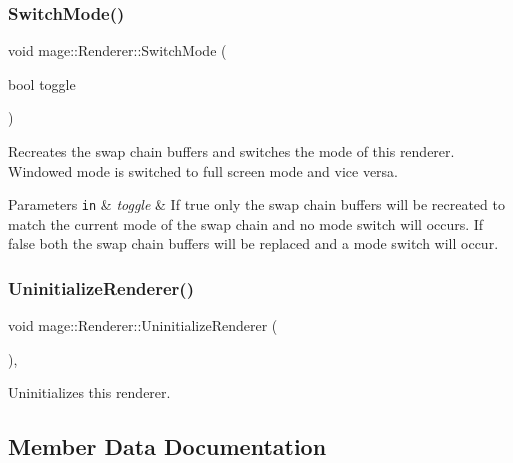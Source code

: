 \subsubsection{\texorpdfstring{Switch\+Mode()}{SwitchMode()}}
{\footnotesize\ttfamily void mage\+::\+Renderer\+::\+Switch\+Mode (\begin{DoxyParamCaption}\item[{bool}]{toggle }\end{DoxyParamCaption})}

Recreates the swap chain buffers and switches the mode of this renderer. Windowed mode is switched to full screen mode and vice versa.


\begin{DoxyParams}[1]{Parameters}
\mbox{\tt in}  & {\em toggle} & If {\ttfamily true} only the swap chain buffers will be recreated to match the current mode of the swap chain and no mode switch will occurs. If {\ttfamily false} both the swap chain buffers will be replaced and a mode switch will occur. \\
\hline
\end{DoxyParams}
\hypertarget{classmage_1_1_renderer_a28c76b49e51e49e58fdeb0b72b12f3b6}{}\label{classmage_1_1_renderer_a28c76b49e51e49e58fdeb0b72b12f3b6} 
\subsubsection{\texorpdfstring{Uninitialize\+Renderer()}{UninitializeRenderer()}}
{\footnotesize\ttfamily void mage\+::\+Renderer\+::\+Uninitialize\+Renderer (\begin{DoxyParamCaption}{ }\end{DoxyParamCaption})\hspace{0.3cm}{\ttfamily [private]}, {\ttfamily [noexcept]}}

Uninitializes this renderer. 

\subsection{Member Data Documentation}
\hypertarget{classmage_1_1_renderer_a8569a868dc96be6d831dcbe1d775f4d1}{}\label{classmage_1_1_renderer_a8569a868dc96be6d831dcbe1d775f4d1} 
